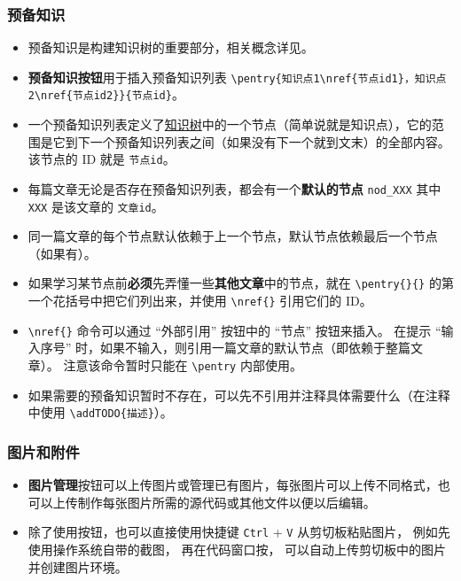 \subsubsection{预备知识}
\begin{itemize}
\item 预备知识是构建知识树的重要部分，相关概念详见。
\item \textbf{预备知识按钮}用于插入预备知识列表 \verb`\pentry{知识点1\nref{节点id1}，知识点2\nref{节点id2}}{节点id}`。
\item 一个预备知识列表定义了\href{https://wuli.wiki/tree/}{知识树}中的一个节点（简单说就是知识点），它的范围是它到下一个预备知识列表之间（如果没有下一个就到文末）的全部内容。 该节点的 ID 就是 \verb`节点id`。
\item 每篇文章无论是否存在预备知识列表，都会有一个\textbf{默认的节点} \verb`nod_XXX` 其中 \verb`XXX` 是该文章的 \verb`文章id`。
\item 同一篇文章的每个节点默认依赖于上一个节点，默认节点依赖最后一个节点（如果有）。
\item 如果学习某节点前\textbf{必须}先弄懂一些\textbf{其他文章}中的节点，就在 \verb`\pentry{}{}` 的第一个花括号中把它们列出来，并使用 \verb`\nref{}` 引用它们的 ID。
\item \verb`\nref{}` 命令可以通过 “外部引用” 按钮中的 “节点” 按钮来插入。 在提示 “输入序号” 时，如果不输入，则引用一篇文章的默认节点（即依赖于整篇文章）。 注意该命令暂时只能在 \verb`\pentry` 内部使用。
\item 如果需要的预备知识暂时不存在，可以先不引用并注释具体需要什么（在注释中使用 \verb`\addTODO{描述}`）。
\end{itemize}

\subsubsection{图片和附件}
\begin{itemize}
\item \textbf{图片管理}按钮可以上传图片或管理已有图片，每张图片可以上传不同格式，也可以上传制作每张图片所需的源代码或其他文件以便以后编辑。
\item 除了使用按钮，也可以直接使用快捷键 \verb`Ctrl` + \verb`V` 从剪切板粘贴图片， 例如先使用操作系统自带的截图， 再在代码窗口按， 可以自动上传剪切板中的图片并创建图片环境。
\end{itemize}


